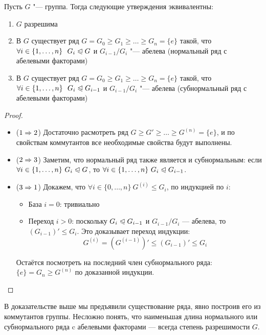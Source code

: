 \begin{theorem}
	Пусть $G$ "--- группа. Тогда следующие утверждения эквивалентны:
	\begin{enumerate}
		\item $G$ разрешима
		\item В $G$ существует ряд $G = G_0 \ge G_1 \ge \ldots \ge G_n = \{e\}$ такой, что $\forall i \in \{1, \ldots, n\}\ \ G_i \normal G$ и $G_{i-1}/G_i$ "--- абелева (нормальный ряд с абелевыми факторами)
		\item В $G$ существует ряд $G = G_0 \ge G_1 \ge \ldots \ge G_n = \{e\}$ такой, что $\forall i \in \{1, \ldots, n\}\ \ G_i \normal G_{i-1}$ и $G_{i-1}/G_i$ "--- абелева (субнормальный ряд с абелевыми факторами)
	\end{enumerate}
\end{theorem}

\begin{proof}~
	\begin{itemize}
		\item ($1 \Rightarrow 2$) Достаточно расмотреть ряд $G \ge G' \ge \ldots \ge G^{(n)} = \{e\}$, и по свойствам коммутантов все необходимые свойства будут выполнены.
		\item ($2 \Rightarrow 3$) Заметим, что нормальный ряд также является и субнормальным: если $\forall i \in \{1, \ldots, n\}\ G_i \trianglelefteqslant G$, то $\forall i \in \{1, \ldots, n\}\ G_i \normal G_{i-1}$.
		\item ($3 \Rightarrow 1$) Докажем, что $\forall i \in \{0, \ldots, n\}\ G^{(i)} \le G_i$, по индукцией по $i$:
		\begin{itemize}
			\item База $i = 0$: тривиально
			
			\item Переход $i > 0$: поскольку $G_i \trianglelefteqslant G_{i - 1}$ и $G_{i - 1} / G_i$ --- абелева, то $(G_{i - 1})' \le G_i$. Это доказывает переход индукции:
			\[
				G^{(i)} = (G^{(i - 1)})' \le (G_{i - 1})' \le G_i
			\]
		\end{itemize}
		Остаётся посмотреть на последний член субнормального ряда: $\{e\} = G_n \ge G^{(n)}$ по доказанной индукции.
	\end{itemize}
\end{proof}

\begin{note}
	В доказательстве выше мы предъявили существование ряда, явно построив его из коммутантов группы. Несложно понять, что наименьшая длина нормального или субнормального ряда c абелевыми факторами --- всегда степень разрешимости $G$.
\end{note}

